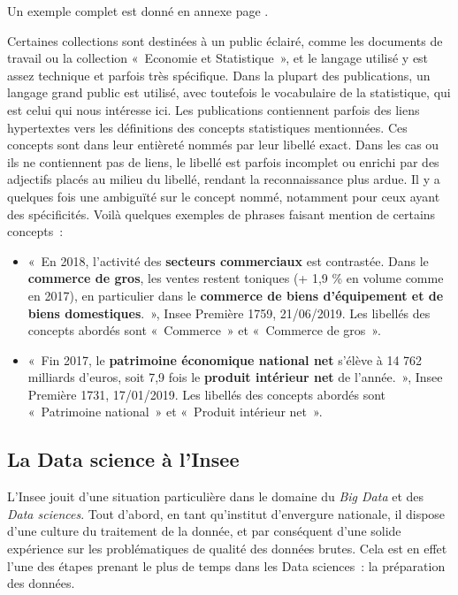 Un exemple complet est donné en annexe page \pageref{publication-xml}.
\newline

Certaines collections sont destinées à un public éclairé, comme les documents de travail ou la collection «~Economie et Statistique~», et le langage utilisé y est assez technique et parfois très spécifique. Dans la plupart des publications, un langage grand public est utilisé, avec toutefois le vocabulaire de la statistique, qui est celui qui nous intéresse ici. Les publications contiennent parfois des liens hypertextes vers les définitions des concepts statistiques mentionnées. Ces concepts sont dans leur entièreté nommés par leur libellé exact. Dans les cas ou ils ne contiennent pas de liens, le libellé est parfois incomplet ou enrichi par des adjectifs placés au milieu du libellé, rendant la reconnaissance plus ardue. Il y a quelques fois une ambiguïté sur le concept nommé, notamment pour ceux ayant des spécificités. Voilà quelques exemples de phrases faisant mention de certains concepts~:
\begin{itemize}
    \vspace{5pt}
    \item «~En 2018, l'activité des \textbf{secteurs commerciaux} est contrastée. Dans le \textbf{commerce de gros}, les ventes restent toniques (+ 1,9 \% en volume comme en 2017), en particulier dans le \textbf{commerce de biens d'équipement et de biens domestiques}.~», Insee Première 1759, 21/06/2019.
    Les libellés des concepts abordés sont «~Commerce~» et «~Commerce de gros~».
    \vspace{5pt}
    \item «~Fin 2017, le \textbf{patrimoine économique national net} s’élève à 14 762 milliards d’euros, soit 7,9 fois le \textbf{produit intérieur net} de l’année.~», Insee Première 1731, 17/01/2019.
    Les libellés des concepts abordés sont «~Patrimoine national~» et «~Produit intérieur net~».
\end{itemize}
\label{section 1.2.2}

\subsection{La Data science à l'Insee}

L'Insee jouit d'une situation particulière dans le domaine du \textit{Big Data} et des \textit{Data sciences}. Tout d'abord, en tant qu'institut d'envergure nationale, il dispose d'une culture du traitement de la donnée, et par conséquent d'une solide expérience sur les problématiques de qualité des données brutes. Cela est en effet l'une des étapes prenant le plus de temps dans les Data sciences~: la préparation des données.
\newline

